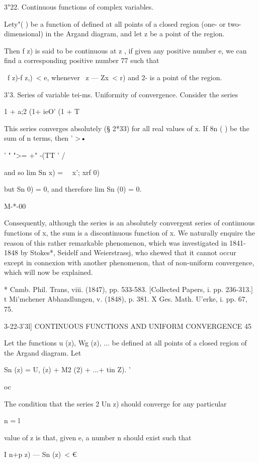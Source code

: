 3"22. Continuous functions of complex variables.

Lety"( ) be a function of defined at all points of a closed region
(one- or two-dimensional) in the Argand diagram, and let z be a point
of the region.

Then f z) is said to be continuous at z , if given any positive number
e, we can find a corresponding positive number 77 such that

\ f z)-f z,)\ < e, whenever \ z — Zx\ < r) and 2- is a point of the
region.

3'3. Series of variable tei-ms. Uniformity of convergence. Consider
the series

  1 + a;2 (1+ ieO' (1 + T

This series converges absolutely (§ 2*33) for all real values of x. If
8n ( ) be the sum of n terms, then ' >•

' " ">= +" -(TT ' /

and so lim Sn x) = \ \ x'; xrf 0)

but Sn 0) = 0, and therefore lim Sn (0) = 0.

M-*-00

Consequently, although the series is an absolutely convergent series
of continuous functions of x, the sum is a discontinuous function of
x. We naturally enquire the reason of this rather remarkable
phenomenon, which was investigated in 1841-1848 by Stokes*, Seidelf
and Weierstrassj, who shewed that it cannot occur except in connexion
with another phenomenon, that of non-uniform convergence, which will
now be explained.

* Cnmb. Phil. Trans, viii. (1847), pp. 533-583. [Collected Papers, i.
pp. 236-313.] t Mi'mchener Abhandlungen, v. (1848), p. 381. X Ges.
Math. U'erke, i. pp. 67, 75.



3-22-3'3l] CONTINUOUS FUNCTIONS AND UNIFORM CONVERGENCE 45

Let the functions u (z), Wg (z), ... be defined at all points of a
closed region of the Argand diagram. Let

Sn (z) = U, (z) + M2 (2) + ...+ tin Z). '

oc

The condition that the series 2 Un z) should converge for any
particular

n = l

value of z is that, given e, a number n should exist such that

I n+p z) — Sn (z)\ < €


